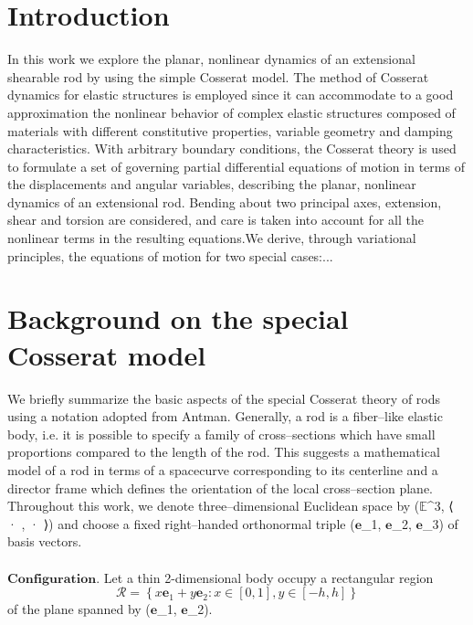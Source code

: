 \documentclass[12pt]{article}
\begin{document}
\section{Introduction}
In this work we explore the planar, nonlinear dynamics of an extensional shearable rod by using the simple Cosserat model. The method of Cosserat dynamics for elastic structures is employed since it can accommodate to a good approximation the nonlinear behavior of complex elastic structures composed of materials with different constitutive properties, variable geometry and damping characteristics. With arbitrary boundary conditions, the Cosserat theory is used to formulate a set of governing partial differential equations of motion in terms of the displacements and angular variables, describing the planar, nonlinear dynamics of an extensional rod. Bending about two principal axes, extension, shear and torsion are considered, and care is taken into account for all the nonlinear terms in the resulting equations.We derive, through variational principles, the equations of motion for two special cases:...

\section{Background on the special Cosserat model}
We briefly summarize the basic aspects of the special Cosserat theory of rods using a notation adopted from Antman. Generally, a rod is a fiber–like elastic body, i.e. it is possible to specify a family of cross–sections which have small proportions compared to the length of the rod. This suggests a mathematical model of a rod in terms of a spacecurve corresponding to its centerline and a director frame which defines the orientation of the local cross–section plane.
Throughout this work, we denote three–dimensional Euclidean space by ($\mathbb{E}$^3, ⟨ · , · ⟩) and choose a fixed right–handed orthonormal triple ($\mathbf{e}$_1, $\mathbf{e}$_2, $\mathbf{e}$_3) of basis vectors.\\\\
$\mathbf{Configuration.}$ Let a thin 2-dimensional body occupy a rectangular region
\[  \mathcal{R}= \left \{
x\mathbf{e}_1 + y\mathbf{e}_2: x\in[0,1] ,y\in[-h,h] 
\right \}\]
of the plane spanned by ($\mathbf{e}$_1, $\mathbf{e}$_2).\\
\end{document}
